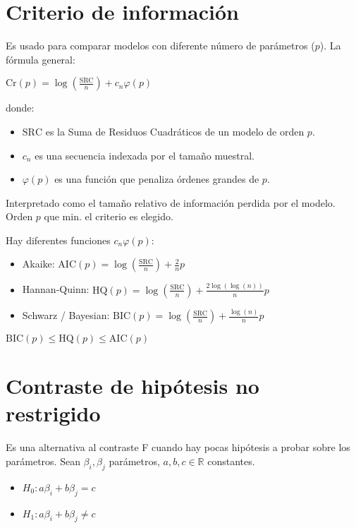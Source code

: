 \documentclass[10pt, a4paper, landscape]{article}
\newcommand{\SSR}{\mathrm{SRC}}
\begin{document}
\begin{multicols}{3}
		\columnbreak
		
		\section*{Criterio de información}
		
		Es usado para comparar modelos con diferente número de parámetros ($p$). La fórmula general:
		
		\begin{center}
			$\mathrm{Cr}(p) = \log(\frac{\SSR}{n}) + c_{n} \varphi (p)$
		\end{center}
		
		donde:
		
		\begin{itemize}[leftmargin=*]
			\item $\SSR$ es la Suma de Residuos Cuadráticos de un modelo de orden $p$.
			\item $c_{n}$ es una secuencia indexada por el tamaño muestral.
			\item $\varphi(p)$ es una función que penaliza órdenes grandes de $p$.
		\end{itemize}
		
		Interpretado como el tamaño relativo de información perdida por el modelo. Orden $p$ que min. el criterio es elegido.
		
		Hay diferentes funciones $c_{n} \varphi(p)$:
		
		\begin{itemize}[leftmargin=*]
			\item Akaike: $\mathrm{AIC}(p) = \log(\frac{\SSR}{n}) + \frac{2}{n}p$
			\item Hannan-Quinn: $\mathrm{HQ}(p) = \log(\frac{\SSR}{n}) + \frac{2 \log(\log(n))}{n}p$
			\item Schwarz / Bayesian: $\mathrm{BIC}(p) = \log(\frac{\SSR}{n}) + \frac{\log(n)}{n}p$
		\end{itemize}
		
		$\mathrm{BIC}(p) \leq \mathrm{HQ}(p) \leq \mathrm{AIC}(p)$
		
		\section*{Contraste de hipótesis no restrigido}
		
		Es una alternativa al contraste F cuando hay pocas hipótesis a probar sobre los parámetros. Sean $\beta_{i}, \beta_{j}$ parámetros, $a, b, c \in \mathbb{R}$ constantes.
		
		\begin{itemize}[leftmargin=*]
			\item $H_{0}: a \beta_{i} + b \beta_{j} = c$
			\item $H_{1}: a \beta_{i} + b \beta_{j} \neq c$
		\end{itemize}
		

\end{multicols}
\end{document}
